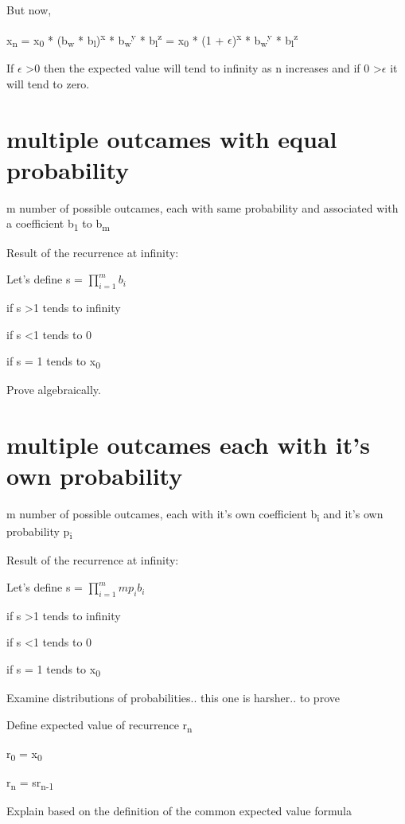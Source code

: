 \documentclass[12pt,reqno]{amsart}
\begin{document}
But now, 

x\textsubscript{n} = x\textsubscript{0} * (b\textsubscript{w} * b\textsubscript{l})\textsuperscript{x} * b\textsubscript{w}\textsuperscript{y} * b\textsubscript{l}\textsuperscript{z} = x\textsubscript{0} * (1 + $\epsilon$)\textsuperscript{x} * b\textsubscript{w}\textsuperscript{y} * b\textsubscript{l}\textsuperscript{z}

If $\epsilon$ \textgreater 0 then the expected value will tend to infinity as n increases and if 0 \textgreater $\epsilon$ it will tend to zero.


\section{multiple outcames with equal probability}

m number of possible outcames, each with same probability and associated with a coefficient b\textsubscript{1} to b\textsubscript{m}



Result of the recurrence at infinity:



Let's define s = $\prod_{i=1}^{m} b_{i}$

if s \textgreater 1 tends to infinity

if s \textless 1 tends to 0

if s = 1 tends to x\textsubscript{0}


Prove algebraically.

\section{multiple outcames each with it's own probability}

m number of possible outcames, each with it's own coefficient b\textsubscript{i} and it's own probability p\textsubscript{i}

Result of the recurrence at infinity:

Let's define s = $\prod_{i=1}^{m} mp_{i}b_{i}$



if s \textgreater 1 tends to infinity

if s \textless 1 tends to 0

if s = 1 tends to x\textsubscript{0}



Examine distributions of probabilities.. this one is harsher.. to prove



Define expected value of recurrence r\textsubscript{n}

r\textsubscript{0} = x\textsubscript{0}

r\textsubscript{n} = sr\textsubscript{n-1}

Explain based on the definition of the common expected value formula
\end{document}
